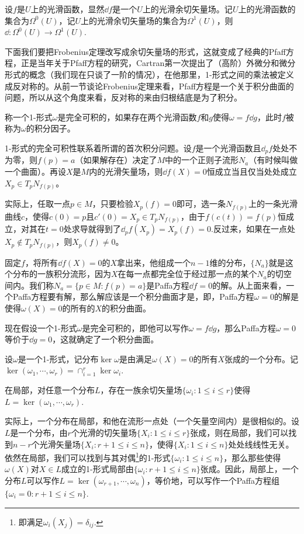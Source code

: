 \para 设$f$是$U$上的光滑函数，显然$\dd f$是一个$U$上的光滑余切矢量场。记$U$上的光滑函数的集合为$\Omega^0(U)$，记$U$上的光滑余切矢量场的集合为$\Omega^1(U)$，则$\dd: \Omega^0(U)\to \Omega^1(U)$.

下面我们要把Frobenius定理改写成余切矢量场的形式，这就变成了经典的Pfaff方程，正是当年关于Pfaff方程的研究，Cartran第一次提出了（高阶）外微分和微分形式的概念（我们现在只谈了一阶的情况），在他那里，1-形式之间的乘法被定义成反对称的。从前一节谈论Frobenius定理来看，Pfaff方程是一个关于积分曲面的问题，所以从这个角度来看，反对称的来由归根结底是为了积分。

\para 称一个1-形式$\omega$是完全可积的，如果存在两个光滑函数$f$和$g$使得$\omega=f\dd g$，此时$f$被称为$\omega$的积分因子。

1-形式的完全可积性联系着所谓的首次积分问题。设$f$是一个光滑函数且$\dd_p f$处处不为零，则$f(p)=a$（如果解存在）决定了$M$中的一个正则子流形$N_a$（有时候叫做一个曲面）。再设$X$是$M$内的光滑矢量场，则$\dd f(X)=0$恒成立当且仅当处处成立$X_p\in T_pN_{f(p)}$。

实际上，任取一点$p\in M$，只要检验$X_p(f)=0$即可，选一条$N_{f(p)}$上的一条光滑曲线$c$，使得$c(0)=p$且$c'(0)=X_p\in T_pN_{f(p)}$，由于$f(c(t))=f(p)$恒成立，对其在$t=0$处求导就得到了$\dd_pf(X_p)=X_p(f)=0$.反过来，如果在一点处$X_p\notin T_pN_{f(p)}$，则$X_p(f)\neq 0$。

固定$f$，将所有$\dd f(X)=0$的$X$拿出来，他组成一个$n-1$维的分布，$\{N_a\}$就是这个分布的一族积分流形，因为$X$在每一点都完全位于经过那一点的某个$N_a$的切空间内。我们称$N_a=\{p\in M:f(p)=a\}$是Paffa方程$\dd f=0$的解。从上面来看，一个Paffa方程要有解，那么解应该是一个积分曲面才是，即，Paffa方程$\omega=0$的解是使得$\omega(X)=0$的所有的$X$的积分曲面。

现在假设一个1-形式$\omega$是完全可积的，即他可以写作$\omega=f\dd g$，那么Paffa方程$\omega=0$等价于$\dd g=0$，这就确定了一个积分曲面。

\para 设$\omega$是一个1-形式，记分布$\ker \omega$是由满足$\omega(X)=0$的所有$X$张成的一个分布。记$\ker(\omega_1,\cdots,\omega_r)=\cap_{i=1}^r\ker \omega_i$.


\para 在局部，对任意一个分布$L$，存在一族余切矢量场$\{\omega_i:1\leq i \leq r\}$使得$L=\ker(\omega_1,\cdots,\omega_r)$.

实际上，一个分布在局部，和他在流形一点处（一个矢量空间内）是很相似的。设$L$是一个分布，由$r$个光滑的切矢量场$\{X_i:1\leq i \leq r\}$张成，则在局部，我们可以找到$n-r$个光滑矢量场$\{X_i:r+1\leq i \leq n\}$，使得$\{X_i:1\leq i \leq n\}$处处线线性无关。依然在局部，我们可以找到与其对偶\footnote{即满足$\omega_i(X_j)=\delta_{ij}$.}的1-形式$\{\omega_i:1\leq i \leq n\}$，那么那些使得$\omega(X)$对$X\in L$成立的1-形式局部由$\{\omega_i:r+1\leq i \leq n\}$张成。因此，局部上，一个分布$L$可以写作$L=\ker(\omega_{r+1},\cdots,\omega_n)$，等价地，可以写作一个Paffa方程组$\{\omega_i=0:r+1\leq i \leq n\}$.

